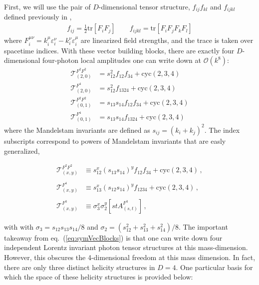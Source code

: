 \documentclass[11pt,letter]{article}
\def\eqn#1{eq.~(\ref{#1})}
\begin{document}
First, we will use the pair of $D$-dimensional tensor structure, $f_{ij}f_{kl}$ and $f_{ijkl}$ defined previously in \cite{Carrasco:2022jxn},
\begin{align}
f_{ij}= \frac{1}{2}\text{tr}[F_iF_j]\qquad f_{ijkl} = \text{tr}[F_iF_jF_kF_l]
\end{align}
where $F_i^{\mu\nu} = k_i^\mu \varepsilon_i^\nu - k_i^\nu \varepsilon_i^\mu$ are linearized field strengths, and the trace is taken over spacetime indices. With these vector building blocks, there are exactly four $D$-dimensional four-photon local amplitudes one can write down at $\mathcal{O}(k^8)$:
\begin{align}\label{eq:symVecBlocks}
\mathcal{T}_{(2,0)}^{F^2F^2} &= s_{12}^2 f_{12}f_{34} + \text{cyc}(2,3,4)
\\
\mathcal{T}_{(2,0)}^{F^4} &= s_{12}^2 f_{1324} + \text{cyc}(2,3,4)
\\
\mathcal{T}_{(0,1)}^{F^2F^2} &= s_{13}s_{14} f_{12}f_{34} + \text{cyc}(2,3,4)
\\
\mathcal{T}_{(0,1)}^{F^4} &= s_{13}s_{14} f_{1324} + \text{cyc}(2,3,4)
\end{align}
where the Mandelstam invariants are defined as $s_{ij} = (k_i+k_j)^2$.  The index subscripts correspond to powers of Mandelstam invariants that are easly generalized,
\begin{eBox}
\begin{equation}\label{eq:basisTensors}
\begin{aligned}
\mathcal{T}^{F^2F^2}_{(x,y)} &\equiv s_{12}^x (s_{13}s_{14})^y f_{12}f_{34}+\text{cyc}(2,3,4)\,,
\\\\
\mathcal{T}^{F^4}_{(x,y)} &\equiv s_{13}^x (s_{12}s_{14})^y f_{1234}+\text{cyc}(2,3,4)\,,
\\\\
\mathcal{T}^{F^3}_{(x,y)} &\equiv \sigma_3^{x} \sigma_2^y [st A^{F^3}_{(s,t)}]\,,
\end{aligned}
\end{equation}
\end{eBox}
with with $\sigma_3 = s_{12}s_{13}s_{14}/8$ and $\sigma_2 = (s_{12}^2+s_{13}^2+s_{14}^2)/8$. The important takeaway from \eqn{eq:symVecBlocks} is that one can write down four independent Lorentz invariant photon tensor structures at this mass-dimension. However, this obscures the 4-dimensional freedom at this mass dimension. In fact, there are only three distinct helicity structures in $D=4$. One particular basis for which the space of these helicity structures is provided below:
\end{document}
